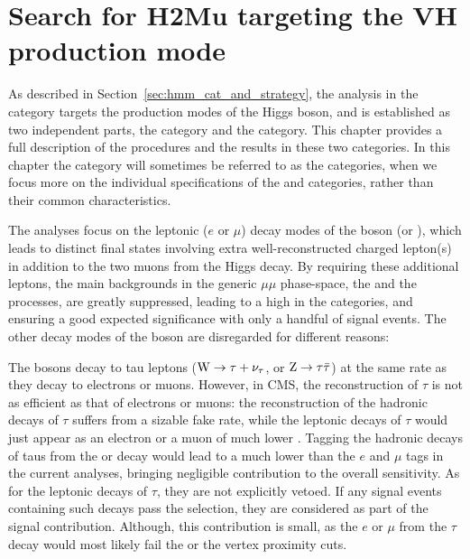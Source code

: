 \chapter{Search for H2Mu targeting the VH production mode}\label{chp:VH_analysis}

As described in Section~\ref{sec:hmm_cat_and_strategy}, the analysis in the \VH category targets the \VH production modes of the Higgs boson, 
and is established as two independent parts, the \WH category and the \ZH category.
This chapter provides a full description of the procedures and the results in these two categories.
In this chapter the \VH category will sometimes be referred to as the \VH categories, 
when we focus more on the individual specifications of the \WH and \ZH categories, rather than their common characteristics.

The \VH analyses focus on the leptonic ($e$ or $\mu$) decay modes of the \PV boson (\PW or \PZ), 
which leads to distinct final states involving extra well-reconstructed charged lepton(s) in addition to the two muons from the Higgs decay.
By requiring these additional leptons, the main backgrounds in the generic $\mu\mu$ phase-space, the \DY and the \ttbar processes, are greatly suppressed,
leading to a high \SoB in the \VH categories, and ensuring a good expected significance with only a handful of signal events.
The other decay modes of the \PV boson are disregarded for different reasons:

The \PV bosons decay to tau leptons ($\mathrm{W} \to \tau+\nu_{\tau}$, or $\mathrm{Z} \to \tau\bar{\tau}$) at the same rate as they decay to electrons or muons. 
However, in CMS, the reconstruction of $\tau$ is not as efficient as that of electrons or muons: 
the reconstruction of the hadronic decays of $\tau$ suffers from a sizable fake rate, 
while the leptonic decays of $\tau$ would just appear as an electron or a muon of much lower \pt.
Tagging the hadronic decays of taus from the \PW or \PZ decay would lead to a much lower \SoB than the $e$ and $\mu$ tags in the current \VH analyses,
bringing negligible contribution to the overall sensitivity.
As for the leptonic decays of $\tau$, they are not explicitly vetoed.
If any \VH signal events containing such decays pass the selection, they are considered as part of the signal contribution.
Although, this contribution is small, as the $e$ or $\mu$ from the $\tau$ decay would most likely fail the \pt or the vertex proximity cuts.

